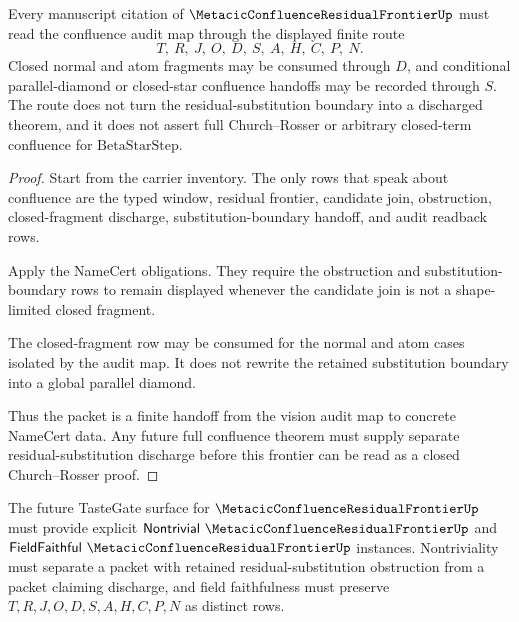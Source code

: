 \begin{theorem}
\label{thm:metacic-confluence-residual-frontier-vision-handoff}
Every manuscript citation of $\MetacicConfluenceResidualFrontierUp$ must read the confluence audit map through the displayed finite route
$$
T,\ R,\ J,\ O,\ D,\ S,\ A,\ H,\ C,\ P,\ N .
$$
Closed normal and atom fragments may be consumed through $D$, and conditional parallel-diamond or closed-star confluence handoffs may be recorded through $S$. The route does not turn the residual-substitution boundary into a discharged theorem, and it does not assert full Church--Rosser or arbitrary closed-term confluence for $\mathrm{BetaStarStep}$.
\end{theorem}
\begin{proof}
Start from the carrier inventory. The only rows that speak about confluence are the typed window, residual frontier, candidate join, obstruction, closed-fragment discharge, substitution-boundary handoff, and audit readback rows.

Apply the NameCert obligations. They require the obstruction and substitution-boundary rows to remain displayed whenever the candidate join is not a shape-limited closed fragment.

The closed-fragment row may be consumed for the normal and atom cases isolated by the audit map. It does not rewrite the retained substitution boundary into a global parallel diamond.

Thus the packet is a finite handoff from the vision audit map to concrete NameCert data. Any future full confluence theorem must supply separate residual-substitution discharge before this frontier can be read as a closed Church--Rosser proof.
\end{proof}

The future TasteGate surface for $\MetacicConfluenceResidualFrontierUp$ must provide explicit $\mathsf{Nontrivial}\ \MetacicConfluenceResidualFrontierUp$ and $\mathsf{FieldFaithful}\ \MetacicConfluenceResidualFrontierUp$ instances. Nontriviality must separate a packet with retained residual-substitution obstruction from a packet claiming discharge, and field faithfulness must preserve $T,R,J,O,D,S,A,H,C,P,N$ as distinct rows.


